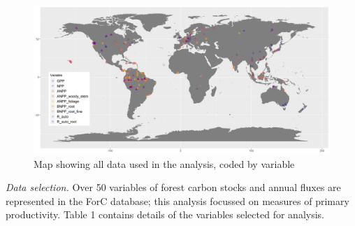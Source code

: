\documentclass[]{article}
\begin{document}
\begin{figure}[H]
\includegraphics[width=1\linewidth]{distribution_all_variables} \caption{Map showing all data used in the analysis, coded by variable}\label{fig:unnamed-chunk-5}
\end{figure}

\emph{Data selection.} Over 50 variables of forest carbon stocks and
annual fluxes are represented in the ForC database; this analysis
focussed on measures of primary productivity. Table 1 contains details
of the variables selected for analysis.
\end{document}
